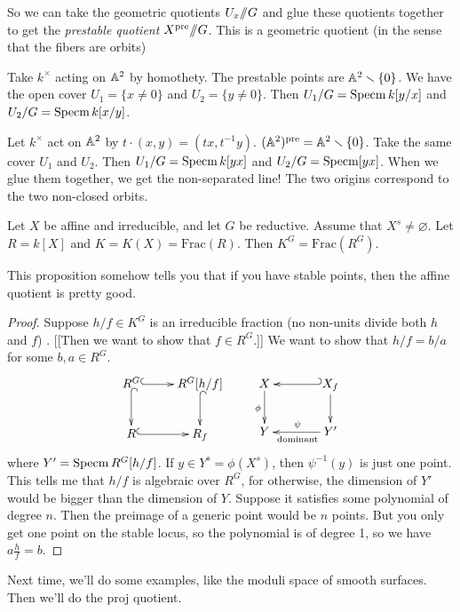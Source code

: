 So we can take the geometric quotients $U_x\quot G$ and glue these quotients together to get the \emph{prestable quotient} $X^\pre\quot G$. This is a geometric quotient (in the sense that the fibers are orbits) 
\begin{example}
 Take $k^\times$ acting on $\AA^2$ by homothety. The prestable points are $\AA^2\setminus \{0\}$. We have the open cover $U_1=\{x\neq 0\}$ and $U_2=\{y\neq 0\}$. Then $U_1/G=\specm k[y/x]$ and $U_2/G=\specm k[x/y]$.
\end{example}
\begin{example}
 Let $k^\times$ act on $\AA^2$ by $t\cdot (x,y)=(tx,t^{-1}y)$. $(\AA^2)^\pre=\AA^2\setminus \{0\}$. Take the same cover $U_1$ and $U_2$. Then $U_1/G=\specm k[yx]$ and $U_2/G=\specm[yx]$. When we glue them together, we get the non-separated line! The two origins correspond to the two non-closed orbits.
\end{example}
\begin{proposition}
 Let $X$ be affine and irreducible, and let $G$ be reductive. Assume that $X^s\neq \varnothing$. Let $R=k[X]$ and $K=K(X)=\mathrm{Frac}(R)$. Then $K^G=\mathrm{Frac}(R^G)$.
\end{proposition}
 This proposition somehow tells you that if you have stable points, then the affine quotient is pretty good.
\begin{proof}
 Suppose $h/f\in K^G$ is an irreducible fraction (no non-units divide both $h$ and $f$) . [[Then we want to show that $f\in R^G$.]] We want to show that $h/f=b/a$ for some $b,a\in R^G$.
 \[\xymatrix{
  R^G \ar@{^(->}[d] \ar@{^(->}[r] & R^G[h/f] \ar@{^(->}[d]\\
  R\ar@{^(->}[r] & R_f
 }\qquad
 \xymatrix@C+1pc{
  X\ar[d]_\phi & X_f \ar@{_(->}[l]\ar[d]\\
  Y & Y' \ar[l]_\psi^{\text{dominant}}
 }\]
 where $Y'=\specm R^G[h/f]$. If $y\in Y^s=\phi(X^s)$, then $\psi^{-1}(y)$ is just one point. This tells me that $h/f$ is algebraic over $R^G$, for otherwise, the dimension of $Y'$ would be bigger than the dimension of $Y$. Suppose it satisfies some polynomial of degree $n$. Then the preimage of a generic point would be $n$ points. But you only get one point on the stable locus, so the polynomial is of degree 1, so we have $a\frac hf=b$. 
\end{proof}

Next time, we'll do some examples, like the moduli space of smooth surfaces. Then we'll do the proj quotient.